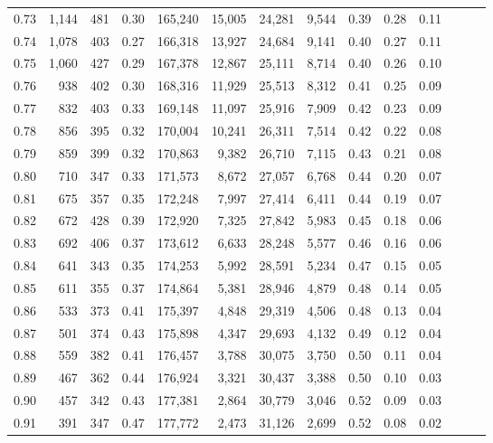 \begin{tabular}{rrrrrrrrrrrrrr}
0.73 &  1,144 &  481 &  0.30 &  165,240 &   15,005 &  24,281 &   9,544 &  0.39 &  0.28 &      0.11 \\
0.74 &  1,078 &  403 &  0.27 &  166,318 &   13,927 &  24,684 &   9,141 &  0.40 &  0.27 &      0.11 \\
0.75 &  1,060 &  427 &  0.29 &  167,378 &   12,867 &  25,111 &   8,714 &  0.40 &  0.26 &      0.10 \\
0.76 &    938 &  402 &  0.30 &  168,316 &   11,929 &  25,513 &   8,312 &  0.41 &  0.25 &      0.09 \\
0.77 &    832 &  403 &  0.33 &  169,148 &   11,097 &  25,916 &   7,909 &  0.42 &  0.23 &      0.09 \\
0.78 &    856 &  395 &  0.32 &  170,004 &   10,241 &  26,311 &   7,514 &  0.42 &  0.22 &      0.08 \\
0.79 &    859 &  399 &  0.32 &  170,863 &    9,382 &  26,710 &   7,115 &  0.43 &  0.21 &      0.08 \\
0.80 &    710 &  347 &  0.33 &  171,573 &    8,672 &  27,057 &   6,768 &  0.44 &  0.20 &      0.07 \\
0.81 &    675 &  357 &  0.35 &  172,248 &    7,997 &  27,414 &   6,411 &  0.44 &  0.19 &      0.07 \\
0.82 &    672 &  428 &  0.39 &  172,920 &    7,325 &  27,842 &   5,983 &  0.45 &  0.18 &      0.06 \\
0.83 &    692 &  406 &  0.37 &  173,612 &    6,633 &  28,248 &   5,577 &  0.46 &  0.16 &      0.06 \\
0.84 &    641 &  343 &  0.35 &  174,253 &    5,992 &  28,591 &   5,234 &  0.47 &  0.15 &      0.05 \\
0.85 &    611 &  355 &  0.37 &  174,864 &    5,381 &  28,946 &   4,879 &  0.48 &  0.14 &      0.05 \\
0.86 &    533 &  373 &  0.41 &  175,397 &    4,848 &  29,319 &   4,506 &  0.48 &  0.13 &      0.04 \\
0.87 &    501 &  374 &  0.43 &  175,898 &    4,347 &  29,693 &   4,132 &  0.49 &  0.12 &      0.04 \\
0.88 &    559 &  382 &  0.41 &  176,457 &    3,788 &  30,075 &   3,750 &  0.50 &  0.11 &      0.04 \\
0.89 &    467 &  362 &  0.44 &  176,924 &    3,321 &  30,437 &   3,388 &  0.50 &  0.10 &      0.03 \\
0.90 &    457 &  342 &  0.43 &  177,381 &    2,864 &  30,779 &   3,046 &  0.52 &  0.09 &      0.03 \\
0.91 &    391 &  347 &  0.47 &  177,772 &    2,473 &  31,126 &   2,699 &  0.52 &  0.08 &      0.02 \\

\end{tabular}
